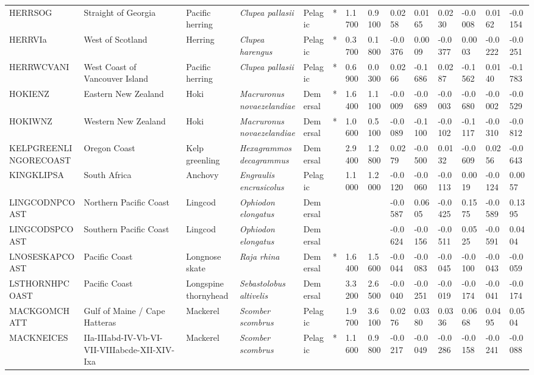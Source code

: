 \begin{longtable}{p{2.8cm}p{2cm}p{1.7cm}p{1.7cm}p{1cm}p{0.3cm}p{1cm}p{1cm}p{1cm}p{1cm}p{1cm}p{1cm}p{1cm}p{1cm}}
  HERRSOG & Straight of Georgia & Pacific herring & \textit{Clupea pallasii} & Pelagic & * & 1.1700 & 0.9100 & 0.0258 & 0.0165 & 0.0230 & -0.0008 & 0.0162 & -0.0154 \\ 
  HERRVIa & West of Scotland & Herring & \textit{Clupea harengus} & Pelagic & * & 0.3700 & 0.1800 & -0.0376 & 0.0009 & -0.0377 & 0.0003 & -0.0222 & -0.0251 \\ 
  HERRWCVANI & West Coast of Vancouver Island & Pacific herring & \textit{Clupea pallasii} & Pelagic & * & 0.6900 & 0.0300 & 0.0266 & -0.1686 & 0.0287 & -0.1562 & 0.0140 & -0.1783 \\ 
  HOKIENZ & Eastern New Zealand & Hoki & \textit{Macruronus novaezelandiae} & Demersal & * & 1.6400 & 1.1100 & -0.0009 & -0.0689 & -0.0003 & -0.0680 & -0.0002 & -0.0529 \\ 
  HOKIWNZ & Western New Zealand & Hoki & \textit{Macruronus novaezelandiae} & Demersal & * & 1.0600 & 0.5100 & -0.0089 & -0.1100 & -0.0102 & -0.1117 & -0.0310 & -0.0812 \\ 
  KELPGREENLINGORECOAST & Oregon Coast & Kelp greenling & \textit{Hexagrammos decagrammus} & Demersal &   & 2.9400 & 1.2800 & 0.0279 & -0.0500 & 0.0132 & -0.0609 & 0.0256 & -0.0643 \\ 
  KINGKLIPSA & South Africa & Anchovy & \textit{Engraulis encrasicolus} & Pelagic &   & 1.1000 & 1.2000 & -0.0120 & -0.0060 & -0.0113 & 0.0019 & -0.0124 & 0.0057 \\ 
  LINGCODNPCOAST & Northern Pacific Coast & Lingcod & \textit{Ophiodon elongatus} & Demersal &  &  &  & -0.0587 & 0.0605 & -0.0425 & 0.1575 & -0.0589 & 0.1395 \\ 
  LINGCODSPCOAST & Southern Pacific Coast & Lingcod & \textit{Ophiodon elongatus} & Demersal &  &  &  & -0.0624 & -0.0156 & -0.0511 & 0.0525 & -0.0591 & 0.0404 \\ 
  LNOSESKAPCOAST & Pacific Coast & Longnose skate & \textit{Raja rhina} & Demersal & * & 1.6400 & 1.5600 & -0.0044 & -0.0083 & -0.0045 & -0.0100 & -0.0043 & -0.0059 \\ 
  LSTHORNHPCOAST & Pacific Coast & Longspine thornyhead & \textit{Sebastolobus altivelis} & Demersal &   & 3.3200 & 2.6500 & -0.0040 & -0.0251 & -0.0019 & -0.0174 & -0.0041 & -0.0174 \\ 
  MACKGOMCHATT & Gulf of Maine / Cape Hatteras & Mackerel & \textit{Scomber scombrus} & Pelagic &   & 1.9700 & 3.6100 & 0.0276 & 0.0380 & 0.0336 & 0.0668 & 0.0495 & 0.0504 \\ 
  MACKNEICES & IIa-IIIabd-IV-Vb-VI-VII-VIIIabcde-XII-XIV-Ixa & Mackerel & \textit{Scomber scombrus} & Pelagic & * & 1.1600 & 0.9800 & -0.0217 & -0.0049 & -0.0286 & -0.0158 & -0.0241 & -0.0088 \\ 

\end{longtable}
